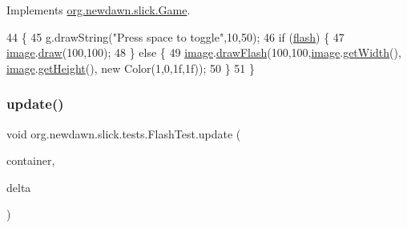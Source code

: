 Implements \mbox{\hyperlink{interfaceorg_1_1newdawn_1_1slick_1_1_game_af1a4670d43eb3ba04dfcf55ab1975b64}{org.\+newdawn.\+slick.\+Game}}.


\begin{DoxyCode}
44                                                             \{
45         g.drawString(\textcolor{stringliteral}{"Press space to toggle"},10,50);
46         \textcolor{keywordflow}{if} (\mbox{\hyperlink{classorg_1_1newdawn_1_1slick_1_1tests_1_1_flash_test_a190c127d700a8eb39c86d39f26b83d7f}{flash}}) \{
47             \mbox{\hyperlink{classorg_1_1newdawn_1_1slick_1_1tests_1_1_flash_test_af72465c4320b1f9ceb938886132ccf84}{image}}.\mbox{\hyperlink{classorg_1_1newdawn_1_1slick_1_1_image_a9bddcca05c7140ab45df8ac5b250b6cd}{draw}}(100,100);
48         \} \textcolor{keywordflow}{else} \{
49             \mbox{\hyperlink{classorg_1_1newdawn_1_1slick_1_1tests_1_1_flash_test_af72465c4320b1f9ceb938886132ccf84}{image}}.\mbox{\hyperlink{classorg_1_1newdawn_1_1slick_1_1_image_a5413e23c618b2219effab1115eab40eb}{drawFlash}}(100,100,\mbox{\hyperlink{classorg_1_1newdawn_1_1slick_1_1tests_1_1_flash_test_af72465c4320b1f9ceb938886132ccf84}{image}}.\mbox{\hyperlink{classorg_1_1newdawn_1_1slick_1_1_image_a94a5d32276e8a27930480223c5d69e11}{getWidth}}(), 
      \mbox{\hyperlink{classorg_1_1newdawn_1_1slick_1_1tests_1_1_flash_test_af72465c4320b1f9ceb938886132ccf84}{image}}.\mbox{\hyperlink{classorg_1_1newdawn_1_1slick_1_1_image_aa2594a93f5126f60ad8a72444fceee98}{getHeight}}(), \textcolor{keyword}{new} Color(1,0,1f,1f));
50         \}
51     \}
\end{DoxyCode}
\mbox{\label{classorg_1_1newdawn_1_1slick_1_1tests_1_1_flash_test_a14e18f7793ff0b37feb42c33d66b67a2}} 
\subsubsection{\texorpdfstring{update()}{update()}}
{\footnotesize\ttfamily void org.\+newdawn.\+slick.\+tests.\+Flash\+Test.\+update (\begin{DoxyParamCaption}\item[{\mbox{\hyperlink{classorg_1_1newdawn_1_1slick_1_1_game_container}{Game\+Container}}}]{container,  }\item[{int}]{delta }\end{DoxyParamCaption})\hspace{0.3cm}{\ttfamily [inline]}}

